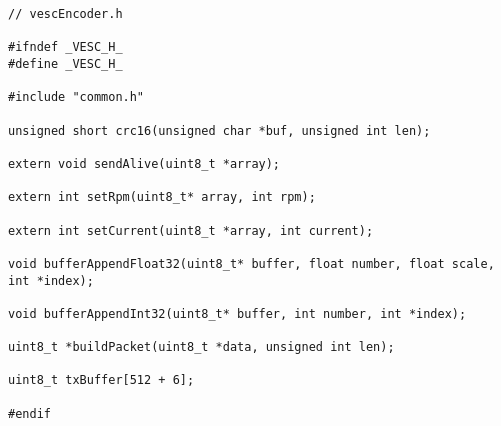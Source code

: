 \newpage

\begin{lstlisting}
// vescEncoder.h

#ifndef _VESC_H_
#define _VESC_H_

#include "common.h"

unsigned short crc16(unsigned char *buf, unsigned int len);

extern void sendAlive(uint8_t *array);

extern int setRpm(uint8_t* array, int rpm);

extern int setCurrent(uint8_t *array, int current);

void bufferAppendFloat32(uint8_t* buffer, float number, float scale, int *index);

void bufferAppendInt32(uint8_t* buffer, int number, int *index);

uint8_t *buildPacket(uint8_t *data, unsigned int len);

uint8_t txBuffer[512 + 6];

#endif
\end{lstlisting}

